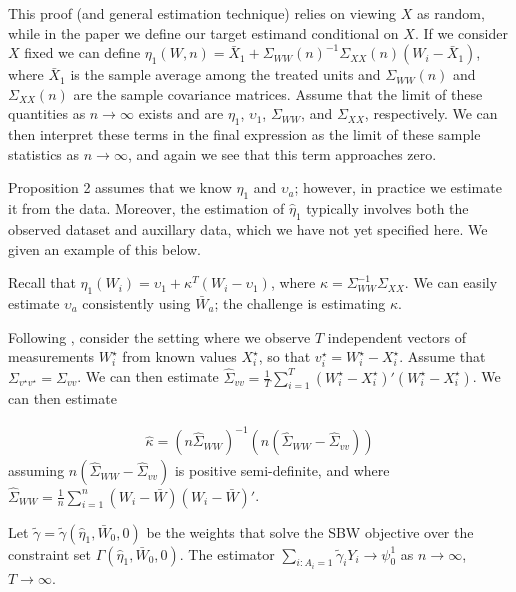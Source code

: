 \begin{remark}
    This proof (and general estimation technique) relies on viewing $X$ as random, while in the paper we define our target estimand conditional on $X$. If we consider $X$ fixed we can define $\eta_1(W, n) = \bar{X}_1 + \Sigma_{WW}(n)^{-1}\Sigma_{XX}(n)(W_i - \bar{X}_1)$, where $\bar{X}_1$ is the sample average among the treated units and $\Sigma_{WW}(n)$ and $\Sigma_{XX}(n)$ are the sample covariance matrices. Assume that the limit of these quantities as $n \to \infty$ exists and are $\eta_1$, $\upsilon_1$, $\Sigma_{WW}$, and $\Sigma_{XX}$, respectively. We can then interpret these terms in the final expression as the limit of these sample statistics as $n \to \infty$, and again we see that this term approaches zero.
\end{remark}

Proposition 2 assumes that we know $\eta_1$ and $\upsilon_a$; however, in practice we estimate it from the data. Moreover, the estimation of $\hat{\eta}_1$ typically involves both the observed dataset and auxillary data, which we have not yet specified here. We given an example of this below.

Recall that $\eta_1(W_i) = \upsilon_1 + \kappa^T(W_i - \upsilon_1)$, where $\kappa = \Sigma_{WW}^{-1}\Sigma_{XX}$. We can easily estimate $\upsilon_a$ consistently using $\bar{W}_a$; the challenge is estimating $\kappa$. 

Following \cite{gleser1992importance}, consider the setting where we observe $T$ independent vectors of measurements $W_i^\star$ from known values $X_i^\star$, so that $v_i^\star = W_i^\star - X_i^\star$. Assume that $\Sigma_{v^\star v^\star} = \Sigma_{vv}$. We can then estimate $\hat{\Sigma}_{vv} = \frac{1}{T}\sum_{i=1}^T(W_i^\star - X_i^\star)'(W_i^\star - X_i^\star)$. We can then estimate

\begin{align*}
\hat{\kappa} = (n\hat{\Sigma}_{WW})^{-1}(n(\hat{\Sigma}_{WW} - \hat{\Sigma}_{vv}))
\end{align*}
%
assuming $n(\hat{\Sigma}_{WW} - \hat{\Sigma}_{vv})$ is positive semi-definite, and where $\hat{\Sigma}_{WW} = \frac{1}{n}\sum_{i=1}^n (W_i - \bar{W})(W_i - \bar{W})'$. 

\begin{proposition}
Let $\tilde{\gamma} = \tilde{\gamma}(\hat{\eta}_1, \bar{W}_0, 0)$ be the weights that solve the SBW objective over the constraint set $\Gamma(\hat{\eta}_1, \bar{W}_0, 0)$. The estimator $\sum_{i: A_i = 1}\tilde{\gamma}_iY_i \to \psi^1_0$ as $n \to \infty$, $T \to \infty$.
\end{proposition}


